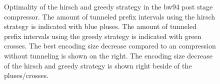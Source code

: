 \documentclass{scrartcl}
\begin{document}
\begin{figure}[h!t]
\caption{Optimality of the hirsch and greedy strategy in the bw94 post stage compressor. The amount of tunneled prefix intervals using the hirsch strategy
	is indicated with blue pluses. The amount of tunneled prefix intervals using the greedy strategy is indicated with green
	crosses. The best encoding size decrease compared to an compression without tunneling is shown on the right. The encoding size decrease
	of the hirsch and greedy strategy is shown right beside of the pluses/crosses.}
\label{fig:tstrat-optimality-bw94}
\end{figure}
\end{document}
